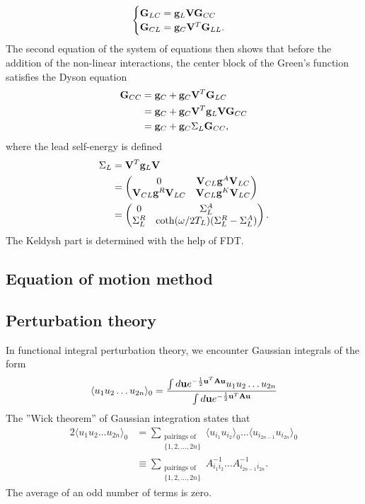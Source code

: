 \begin{equation}
 \begin{cases}
  \mathbf{G}_{LC} = \mathbf{g}_L \mathbf{V} \mathbf{G}_{CC} \\
   \mathbf{G}_{CL} = \mathbf{g}_C\mathbf{V}^T\mathbf{G}_{LL}.
 \end{cases}
\end{equation}
The second equation of the system of equations then shows that before the addition of the non-linear interactions, the center block of the Green's function satisfies the Dyson equation
\begin{alignat}{2}
 \mathbf{G}_{CC} &= \mathbf{g}_C + \mathbf{g}_C \mathbf{V}^T\mathbf{G}_{LC} \\
  &= \mathbf{g}_C + \mathbf{g}_C \mathbf{V}^T \mathbf{g}_L \mathbf{V} \mathbf{G}_{CC} \\
  &= \mathbf{g}_C + \mathbf{g}_C \Sigma_L \mathbf{G}_{CC},
\end{alignat}
where the lead self-energy is defined
\begin{alignat}{2}
 \Sigma_L  &= \mathbf{V}^T \mathbf{g}_L \mathbf{V}  \\
  &= \left(\begin{matrix}
      0 & \mathbf{V}_{CL} \mathbf{g}^A \mathbf{V}_{LC}\\ 
      \mathbf{V}_{CL} \mathbf{g}^R \mathbf{V}_{LC} & \mathbf{V}_{CL} \mathbf{g}^K \mathbf{V}_{LC} 
     \end{matrix}\right) \\
  &= \left(\begin{matrix}
      0 & \Sigma^A_L \\ 
      \Sigma^R_L & \coth(\omega/2T_L)(\Sigma^R_L-\Sigma_L^A)
     \end{matrix}\right).
\end{alignat}
The Keldysh part is determined with the help of FDT.

\subsection{Equation of motion method}

\subsection{Perturbation theory}
In functional integral perturbation theory, we encounter Gaussian integrals of the form
\begin{equation}
 \langle u_1 u_2\dots u_{2n} \rangle_0 = \frac{\int d\mathbf{u} e^{-\frac{1}{2} \mathbf{u}^T \mathbf{A}\mathbf{u}}u_1 u_2\dots u_{2n}}{\int d\mathbf{u}e^{-\frac{1}{2} \mathbf{u}^T \mathbf{A}\mathbf{u}}}
\end{equation}
The ''Wick theorem'' of Gaussian integration states that
\begin{alignat}{2}
 \langle u_1 u_2\dots u_{2n} \rangle_0 &= \sum _{\substack{\textrm{pairings of}\\ \{1,2,\dots,2n\}}} \langle u_{i_1}u_{i_2}\rangle_0 \dots \langle u_{i_{2n-1}}u_{i_{2n}}\rangle_0 \\
  &\equiv \sum _{\substack{\textrm{pairings of}\\ \{1,2,\dots,2n\}}} A^{-1}_{i_1i_2} \dots A^{-1}_{i_{2n-1}i_{2n}}.
\end{alignat}
The average of an odd number of terms is zero.

